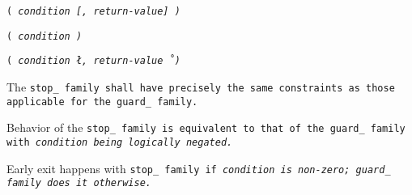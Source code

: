 
\s\s\s\tt{(} \it{condition} [\tt{,} \it{return-value}\opt]  \tt{)}

\s\tt{(} \it{condition} \tt{)}

\s\tt{(} \it{condition} \l\tt{,} \it{return-value}\opt\r\ \tt{)}


The \tt{stop_} family shall have precisely the same
constraints as those applicable for the \tt{guard_} family.


Behavior of the \tt{stop_} family is equivalent to that of the
\tt{guard_} family with \it{condition} being logically negated.

\note Early exit happens with \tt{stop_} family if \it{condition}
is non-zero; \tt{guard_} family does it otherwise.
